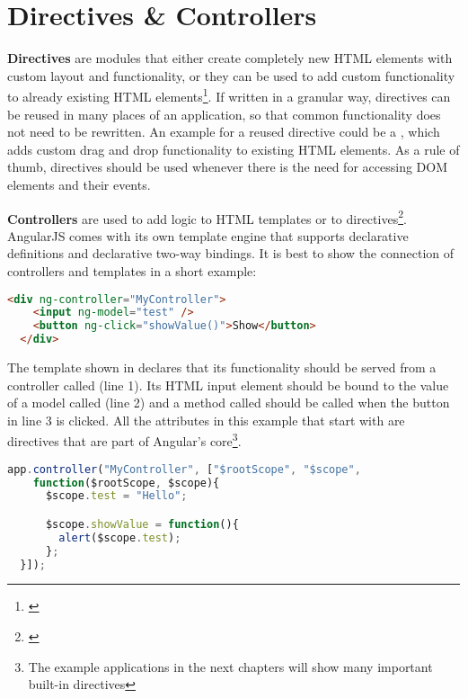 \section{Directives \& Controllers}

\textbf{Directives} are modules that either create completely new HTML elements with custom layout and functionality, or they can be used to add custom functionality to already existing HTML elements\footnote{\cite[p. 61ff]{lerner2013ngbook}}. If written in a granular way, directives can be reused in many places of an application, so that common functionality does not need to be rewritten. An example for a reused directive could be a , which adds custom drag and drop functionality to existing HTML elements. As a rule of thumb, directives should be used whenever there is the need for accessing DOM elements and their events.

\textbf{Controllers} are used to add logic to HTML templates or to directives\footnote{\cite[p. 25ff]{lerner2013ngbook}}. AngularJS comes with its own template engine that supports declarative definitions and declarative two-way bindings. It is best to show the connection of controllers and templates in a short example:

\begin{lstlisting}[language=HTML, caption=A simple AngularJS template, label=lst:angular-template]
  <div ng-controller="MyController">
    <input ng-model="test" />
    <button ng-click="showValue()">Show</button>
  </div>
\end{lstlisting}

The template shown in  declares that its functionality should be served from a controller called  (line 1). Its HTML input element should be bound to the value of a model called  (line 2) and a method called  should be called when the button in line 3 is clicked. All the attributes in this example that start with  are directives that are part of Angular's core\footnote{The example applications in the next chapters will show many important built-in directives}.

\begin{lstlisting}[language=JavaScript, caption=A simple AngularJS controller, label=lst:angular-controller]
  app.controller("MyController", ["$rootScope", "$scope",
    function($rootScope, $scope){
      $scope.test = "Hello";

      $scope.showValue = function(){
        alert($scope.test);
      };
  }]);
\end{lstlisting}

